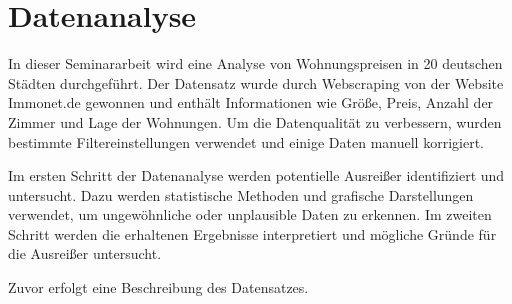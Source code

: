 	\chapter{Datenanalyse}\label{sec:Datenanalyse}
	In dieser Seminararbeit wird eine Analyse von Wohnungspreisen in 20 deutschen Städten durchgeführt. Der Datensatz wurde durch Webscraping von der Website Immonet.de gewonnen und enthält Informationen wie Größe, Preis, Anzahl der Zimmer und Lage der Wohnungen. Um die Datenqualität zu verbessern, wurden bestimmte Filtereinstellungen verwendet und einige Daten manuell korrigiert.
	
	Im ersten Schritt der Datenanalyse werden potentielle Ausreißer identifiziert und untersucht. Dazu werden statistische Methoden und grafische Darstellungen verwendet, um ungewöhnliche oder unplausible Daten zu erkennen. Im zweiten Schritt werden die erhaltenen Ergebnisse interpretiert und mögliche Gründe für die Ausreißer untersucht.
	
	Zuvor erfolgt eine Beschreibung des Datensatzes.
	
	
